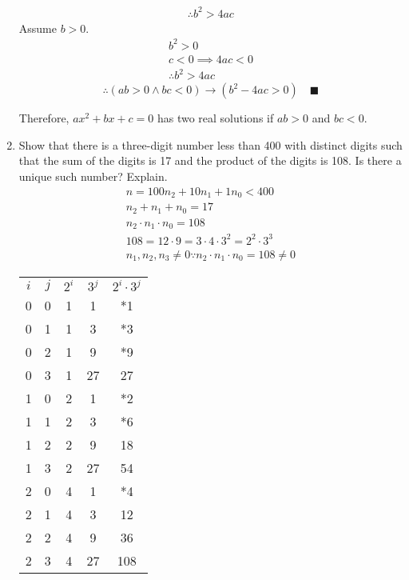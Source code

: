 \documentclass[letterpaper, 12pt]{article}
\newcommand{\qed}{\quad \blacksquare}
\newcommand{\then}{\rightarrow}
\begin{document}
\begin{enumerate}
\begin{gather*}
    \therefore b^2 > 4ac
\end{gather*}
Assume $b > 0$.
\begin{gather*}
    b^2 > 0 \\
    c < 0 \implies 4ac < 0 \\
    \therefore b^2 > 4ac
\end{gather*}
\[\therefore (ab > 0 \wedge bc < 0) \then (b^2 - 4ac > 0) \qed\]
\begin{flushleft}
    Therefore, $ax^2 + bx + c = 0$ has two real solutions if $ab > 0$ and $bc < 0$.
\end{flushleft}
\pagebreak
\item Show that there is a three-digit number less than 400 with distinct digits such that 
the sum of the digits is 17 and the product of the digits is 108. Is there a unique such number? 
Explain.
\begin{gather*}
    n = 100n_2 + 10n_1 + 1n_0 < 400 \\
    n_2 + n_1 + n_0 = 17 \\
    n_2 \cdot n_1 \cdot n_0 = 108 \\
    108 = 12 \cdot 9 = 3 \cdot 4 \cdot 3^2 = 2^2 \cdot 3^3 \\
    n_1, n_2, n_3 \ne 0 \because n_2 \cdot n_1 \cdot n_0 = 108 \ne 0
\end{gather*}
\begin{center}
    \begin{tabular}{c | c | c | c | c}
        $i$ & $j$ & $2^i$ & $3^j$ & $2^i \cdot 3^j$ \\
        0 & 0 & 1 & 1 & *1 \\
        0 & 1 & 1 & 3 & *3 \\
        0 & 2 & 1 & 9 & *9 \\
        0 & 3 & 1 & 27 & 27 \\
        1 & 0 & 2 & 1 & *2 \\
        1 & 1 & 2 & 3 & *6 \\
        1 & 2 & 2 & 9 & 18 \\
        1 & 3 & 2 & 27 & 54 \\
        2 & 0 & 4 & 1 & *4 \\
        2 & 1 & 4 & 3 & 12 \\
        2 & 2 & 4 & 9 & 36 \\
        2 & 3 & 4 & 27 & 108 \\
    \end{tabular}
\end{center}
\begin{gather*}

\end{gather*}
\end{enumerate}
\end{document}
